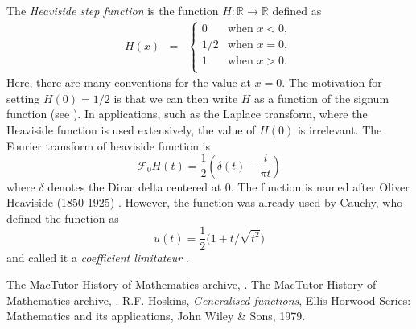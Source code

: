 \documentclass[12pt]{article}
\newcommand{\sR}[0]{\mathbb{R}}
\begin{document}
The \emph{Heaviside step function} is the function $H:\sR\to \sR$ defined as
 \begin{eqnarray*}
 H(x) &=& \left\{ \begin {array}{ll} 0 & \mbox{when}\,\, x< 0, \\
 1/2 & \mbox{when}\,\, x= 0,\\
 1 & \mbox{when}\,\, x> 0.\\
 \end{array} \right.
 \end{eqnarray*}
Here, there are many conventions for the value at $x=0$. The
motivation for setting $H(0)=1/2$ is that we can then write
$H$ as a function of the signum function (see
). In applications, such as
the Laplace transform, where the Heaviside function is used extensively,
the value of $H(0)$ is irrelevant.
The Fourier transform of heaviside function is 
$$\mathcal{F}_0 H(t)=\frac{1}{2}\left(\delta(t)-\frac{i}{\pi t}\right)$$
where $\delta$ denotes the Dirac delta centered at $0$.
The function is named after Oliver Heaviside (1850-1925)
\cite{heaviside_bib}. However, the function was already used by
Cauchy\cite{cauchy_bib}, who defined the function as
$$ u(t) = \frac{1}{2}\big( 1 + t/\sqrt{t^2}\big)$$
and called it a \emph{coefficient limitateur} \cite{hoskins}.

\begin{thebibliography}{9}
 The MacTutor History of Mathematics archive,
 .
 The MacTutor History of Mathematics archive,
 .
 R.F. Hoskins, \emph{Generalised functions},
 Ellis Horwood Series: Mathematics and its applications,
 John Wiley \& Sons, 1979.
\end{thebibliography}
\end{document}
